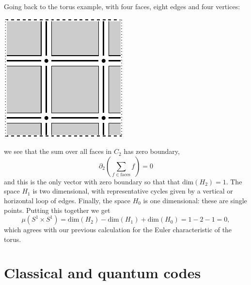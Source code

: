 \documentclass[11pt,oneside]{report}
\def\Im{\mathrm{im}}
\def\Ker{\mathrm{ker}}
\def\Dim{\mathrm{dim}}
\def\euler{\mu}
\begin{document}
Going back to the torus example, with four faces,
eight edges and four vertices:
\begin{center}
\includegraphics{pic-torus-hom.pdf}
\end{center}
we see that the sum over all faces in $C_2$
has zero boundary,
$$
    \partial_2(\sum_{f\in\text{faces}} f) = 0
$$
and this is the only vector with zero boundary so that
that $\Dim(H_2)=1$.
The space $H_1$ is two dimensional, with representative
cycles given by a vertical or horizontal loop of edges.
Finally, the space $H_0$ is one dimensional: these
are single points.
Putting this together we get
$$
    \euler(S^1\times S^1) = 
    \mbox{dim}(H_2) - \mbox{dim}(H_1) + \mbox{dim}(H_0) = 1-2-1 = 0,
$$
which agrees with our previous calculation for the Euler
characteristic of the torus.


\section{Classical and quantum codes}
\end{document}

